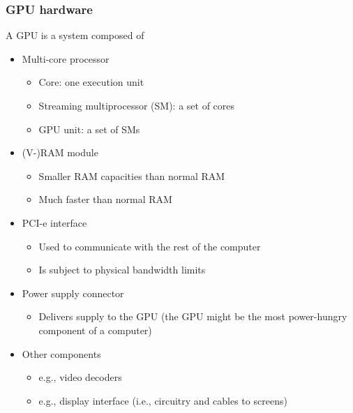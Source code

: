 \documentclass[10pt, aspectratio=1610]{beamer}
\begin{document}
\begin{frame}
  \frametitle{GPU hardware}

  A GPU is a system composed of

  \begin{itemize}
    \item Multi-core processor
      \begin{itemize}
        \item Core: one execution unit
        \item Streaming multiprocessor (SM): a set of cores
        \item GPU unit: a set of SMs
      \end{itemize}
    \item (V-)RAM module
      \begin{itemize}
        \item Smaller RAM capacities than normal RAM
        \item Much faster than normal RAM
      \end{itemize}
    \item PCI-e interface
      \begin{itemize}
        \item Used to communicate with the rest of the computer
        \item Is subject to physical bandwidth limits
      \end{itemize}
    \item Power supply connector
      \begin{itemize}
        \item Delivers supply to the GPU (the GPU might be the most power-hungry component of a computer)
      \end{itemize}
    \item Other components
    \begin{itemize}
      \item e.g., video decoders
      \item e.g., display interface (i.e., circuitry and cables to screens)
    \end{itemize}
  \end{itemize}

\end{frame}
\end{document}
